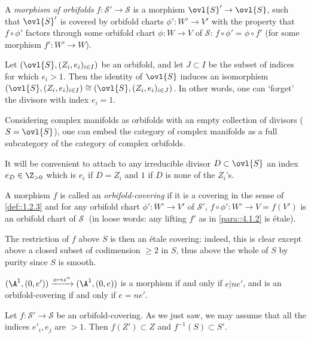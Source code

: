 \begin{para}\label{para::4.1.2} A {\it morphism of orbifolds}
 $f:\mathcal{S}'\to \mathcal{S}$ is a morphism $\ovl{S}'\to \ovl{S}$, such
 that $\ovl{S}'$ is covered by orbifold charts  $\phi': W'\to V'$ with
 the property that $f\circ \phi'$ factors through some orbifold 
 chart $\phi:W\to V$ of $\mathcal{S}$: $f\circ \phi'=\phi\circ f'$ 
(for some morphism $f'\colon W'\to W$).

 \medskip{}  Let $(\ovl{S}, (Z_i,e_i)_{i\in I})$ be
 an orbifold, and let $J\subset I$ be the subset of indices for which
 $e_i>1$. Then the identity of $\ovl{S}$ induces an isomorphism
 $(\ovl{S}, (Z_i,e_i)_{i\in I})\cong (\ovl{S}, (Z_i,e_i)_{i\in J})$. In
 other words, one can `forget' the divisors with index $e_i=1$.
 
 \noindent Considering complex manifolds as orbifolds with an empty
 collection of divisors ($S=\ovl{S}$), one can embed the 
 category of complex manifolds as a full subcategory of the category of
 complex orbifolds.

 \noindent It will be convenient to attach to any irreducible divisor
 $D\subset \ovl{S}$ an index $e_D\in \Z_{>0}$ which is $e_i$ if
 $D=Z_i$ and $1$ if $D$ is none of the $Z_i$'s.


\end{para}

\begin{para}\label{para::4.1.3} A morphism $f$ is called an {\it
 orbifold-covering} if it is a covering in the sense of \ref{def::1.2.3}
 and for any 
 orbifold chart $\phi': W'\to V'$ of $\mathcal{S}'$, $f\circ\phi': W'\to
 V=f(V')$ is an orbifold chart of $\mathcal{S}\;$ (in
 loose words: any lifting $f'$ as in \ref{para::4.1.2} is 
 \'etale).  
 
 \medskip\noindent The restriction of $f$ above $S$ is then an \'etale
 covering: indeed, this is clear except above
 a closed subset of codimension $\geq 2$ in $S$, thus above the whole of
 $S$ by purity since $S$ is smooth.
 
 \medskip{} $(\A^1, (0,e'))
 \xrightarrow{z\mapsto z^n} (\A^1, (0,e)) $ is
 a morphism if and only if $e| ne'$, and is an orbifold-covering if
 and only if 
 $e=ne'$.   
  
\medskip {} Let $f:\mathcal{S}'\to \mathcal{S}$ be
 an orbifold-covering. As we just saw, we may assume 
 that all the indices $e'_i,e_j$ are $>1$. Then $f(Z')\subset Z$ and
 $f^{-1}(S)\subset S'$.
\end{para}

